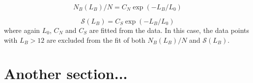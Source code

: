 \begin{equation}
	N_B(L_B) / N = C_N \exp(-L_B / L_0)
	\label{eq:N_non_fractal_SM}
\end{equation}

\begin{equation}
	\mathcal{S}(L_B) = C_S \exp(-L_B / L_0)
	\label{eq:S_non_fractal_SM}
\end{equation}
where again $L_0$, $C_N$ and $C_S$ are fitted from the data. In this case, the data points with $L_B > 12$ are excluded from the fit of both $N_B(L_B) / N$ and $\mathcal{S}(L_B)$.

\section{Another section...}



\newpage